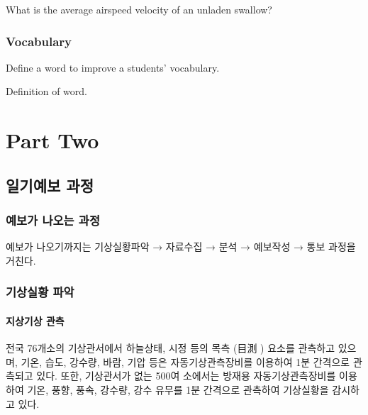 \begin{problem}
	What is the average airspeed velocity of an unladen swallow?
\end{problem}


\section{Vocabulary}

Define a word to improve a students' vocabulary.

\begin{vocabulary}[Word]
	Definition of word.
\end{vocabulary}


\part{Part Two}



\chapter{일기예보 과정}

\section{예보가 나오는 과정}

예보가 나오기까지는 기상실황파악 → 자료수집 → 분석 → 예보작성 → 통보 과정을 거친다. 


\section{기상실황 파악}

\subsection{지상기상 관측}
전국 76개소의 기상관서에서 하늘상태, 시정 등의 목측 (目測 ) 요소를 관측하고 있으며, 기온, 습도, 강수량, 바람, 기압 등은 자동기상관측장비를 이용하여 1분 간격으로 관측되고 있다. 또한, 기상관서가 없는 500여 소에서는 방재용 자동기상관측장비를 이용하여 기온, 풍향, 풍속, 강수량, 강수 유무를 1분 간격으로 관측하여 기상실황을 감시하고 있다.

